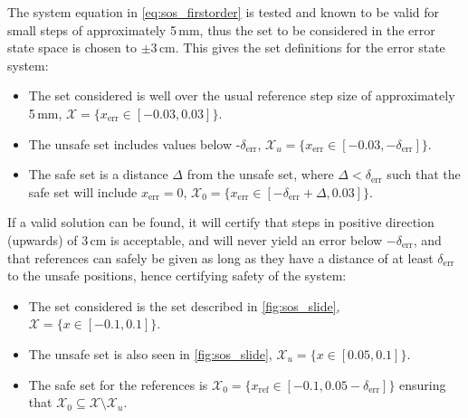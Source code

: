 The system equation in \autoref{eq:sos_firstorder} is tested and known to be valid for small steps of approximately 5\,mm, thus the set to be considered in the error state space is chosen to $\pm 3$\,cm. This gives the set definitions for the error state system:
\vspace{-3mm}
\begin{itemize}
\itemsep-0.7mm
\item The set considered is well over the usual reference step size of approximately 5\,mm, $\mathcal{X}=\{x_\text{err}\in[-0.03,0.03] \}$.
\item The unsafe set includes values below -$\delta_\text{err}$, $\mathcal{X}_u=\{x_\text{err}\in [-0.03,-\delta_\text{err}] \}$.
\item The safe set is a distance $\Delta$ from the unsafe set, where $\Delta<\delta_\text{err}$ such that the safe set will include $x_\text{err}=0$, $\mathcal{X}_0=\{x_\text{err}\in [-\delta_\text{err}+\Delta,0.03] \}$.
\end{itemize}

If a valid solution can be found, it will certify that steps in positive direction (upwards) of 3\,cm is acceptable, and will never yield an error below $-\delta_\text{err}$, and that references can safely be given as long as they have a distance of at least $\delta_\text{err}$ to the unsafe positions, hence certifying safety of the system: %
\vspace{-3mm}
\begin{itemize}
	\itemsep-0.7mm
	\item The set considered is the set described in \autoref{fig:sos_slide}, $\mathcal{X}=\{x\in[-0.1,0.1] \}$.
	\item The unsafe set is also seen in \autoref{fig:sos_slide}, $\mathcal{X}_u=\{x\in [0.05,0.1] \}$.
	\item The safe set for the references is $\mathcal{X}_0=\{x_\text{ref}\in [-0.1,0.05-\delta_\text{err}] \}$ ensuring that $\mathcal{X}_0\subseteq\mathcal{X}\setminus\mathcal{X}_u$.
\end{itemize}

